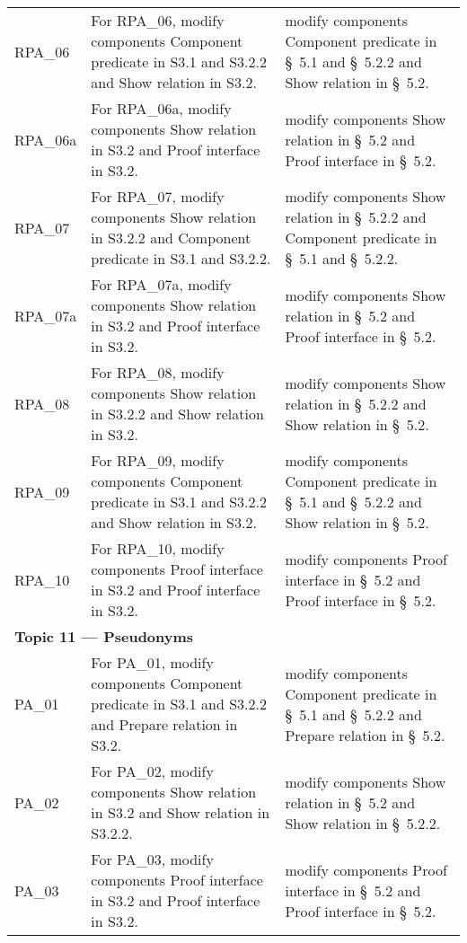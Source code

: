 \begin{landscape}
\begin{longtable}{p{3cm} p{10cm} p{7cm}}
RPA\_06 &
For RPA\_06, modify components Component predicate in S3.1 and S3.2.2 and Show relation in S3.2. &
modify components Component predicate in \S~5.1 and \S~5.2.2 and Show relation in \S~5.2. \\

RPA\_06a &
For RPA\_06a, modify components Show relation in S3.2 and Proof interface in S3.2. &
modify components Show relation in \S~5.2 and Proof interface in \S~5.2. \\

RPA\_07 &
For RPA\_07, modify components Show relation in S3.2.2 and Component predicate in S3.1 and S3.2.2. &
modify components Show relation in \S~5.2.2 and Component predicate in \S~5.1 and \S~5.2.2. \\

RPA\_07a &
For RPA\_07a, modify components Show relation in S3.2 and Proof interface in S3.2. &
modify components Show relation in \S~5.2 and Proof interface in \S~5.2. \\

RPA\_08 &
For RPA\_08, modify components Show relation in S3.2.2 and Show relation in S3.2. &
modify components Show relation in \S~5.2.2 and Show relation in \S~5.2. \\

RPA\_09 &
For RPA\_09, modify components Component predicate in S3.1 and S3.2.2 and Show relation in S3.2. &
modify components Component predicate in \S~5.1 and \S~5.2.2 and Show relation in \S~5.2. \\

RPA\_10 &
For RPA\_10, modify components Proof interface in S3.2 and Proof interface in S3.2. &
modify components Proof interface in \S~5.2 and Proof interface in \S~5.2. \\[1em]


\multicolumn{3}{l}{\textbf{Topic 11 — Pseudonyms}}\\

PA\_01 &
For PA\_01, modify components Component predicate in S3.1 and S3.2.2 and Prepare relation in S3.2. &
modify components Component predicate in \S~5.1 and \S~5.2.2 and Prepare relation in \S~5.2. \\

PA\_02 &
For PA\_02, modify components Show relation in S3.2 and Show relation in S3.2.2. &
modify components Show relation in \S~5.2 and Show relation in \S~5.2.2. \\

PA\_03 &
For PA\_03, modify components Proof interface in S3.2 and Proof interface in S3.2. &
modify components Proof interface in \S~5.2 and Proof interface in \S~5.2. \\


\end{longtable}
\end{landscape}
